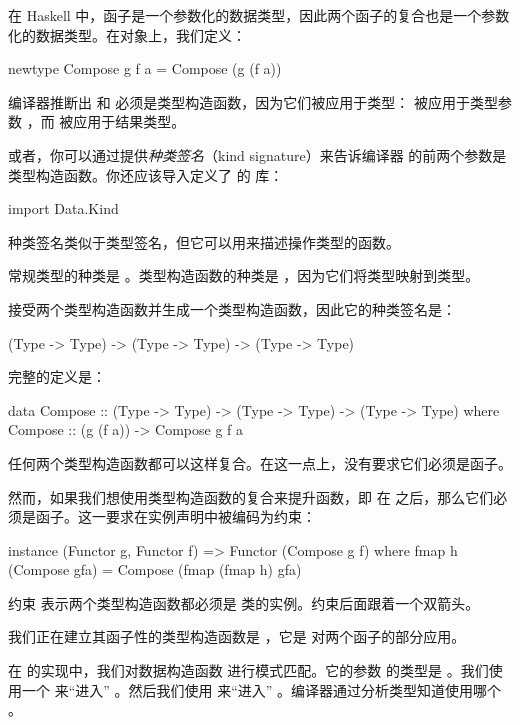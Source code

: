 \documentclass[DaoFP]{subfiles}
\begin{document}
在 Haskell 中，函子是一个参数化的数据类型，因此两个函子的复合也是一个参数化的数据类型。在对象上，我们定义：
\begin{haskell}
newtype Compose g f a = Compose (g (f a))
\end{haskell}
编译器推断出  和  必须是类型构造函数，因为它们被应用于类型： 被应用于类型参数 ，而  被应用于结果类型。

或者，你可以通过提供\emph{种类签名}（kind signature）来告诉编译器  的前两个参数是类型构造函数。你还应该导入定义了  的  库：
\begin{haskell}
import Data.Kind
\end{haskell}

种类签名类似于类型签名，但它可以用来描述操作类型的函数。

常规类型的种类是 。类型构造函数的种类是 ，因为它们将类型映射到类型。

 接受两个类型构造函数并生成一个类型构造函数，因此它的种类签名是：
\begin{haskell}
(Type -> Type) -> (Type -> Type) -> (Type -> Type) 
\end{haskell}
完整的定义是：
\begin{haskell}
data Compose :: (Type -> Type) -> (Type -> Type) -> (Type -> Type) 
  where
    Compose :: (g (f a)) -> Compose g f a
\end{haskell}

任何两个类型构造函数都可以这样复合。在这一点上，没有要求它们必须是函子。

然而，如果我们想使用类型构造函数的复合来提升函数，即  在  之后，那么它们必须是函子。这一要求在实例声明中被编码为约束：
\begin{haskell}
instance (Functor g, Functor f) => Functor (Compose g f) where
  fmap h (Compose gfa) = Compose (fmap (fmap h) gfa)
\end{haskell}
约束  表示两个类型构造函数都必须是  类的实例。约束后面跟着一个双箭头。

我们正在建立其函子性的类型构造函数是 ，它是  对两个函子的部分应用。

在  的实现中，我们对数据构造函数  进行模式匹配。它的参数  的类型是 。我们使用一个  来“进入” 。然后我们使用  来“进入” 。编译器通过分析类型知道使用哪个 。
\end{document}
